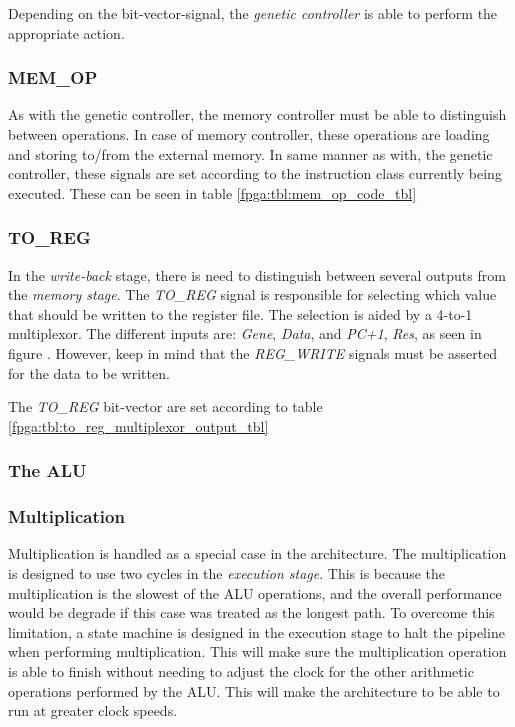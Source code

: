 

Depending on the bit-vector-signal, the \emph{genetic controller} is able to perform the appropriate action. 


\subsubsection{MEM\_OP}
As with the genetic controller, the memory controller must be able to distinguish between operations. In case of memory controller, these operations are loading and storing to/from the external memory. In same manner as with, the genetic controller, these signals are set according to the instruction class currently being executed. These can be seen in table \ref{fpga:tbl:mem_op_code_tbl}




\subsubsection{TO\_REG}
In the \emph{write-back} stage, there is need to distinguish between several outputs from the \emph{memory stage}. The \emph{TO\_REG} signal is responsible for selecting which value that should be written to the register file. The selection is aided by a 4-to-1 multiplexor. The different inputs are: \emph{Gene}, \emph{Data}, and \emph{PC+1}, \emph{Res}, as seen in figure . However, keep in mind that the \emph{REG\_WRITE} signals must be asserted for the data to be written. 

The \emph{TO\_REG} bit-vector are set according to table \ref{fpga:tbl:to_reg_multiplexor_output_tbl}




\subsubsection{The ALU}


\subsubsection{Multiplication}
Multiplication is handled as a special case in the architecture. The multiplication is designed to use two cycles in the \emph{execution stage}. This is because the multiplication is the slowest of the ALU operations, and the overall performance would be degrade if this case was treated as the longest path. To overcome this limitation, a state machine is designed in the execution stage to halt the pipeline when performing multiplication. This will make sure the multiplication operation is able to finish without needing to adjust the clock for the other arithmetic operations performed by the ALU. This will make the architecture to be able to run at greater clock speeds. 



